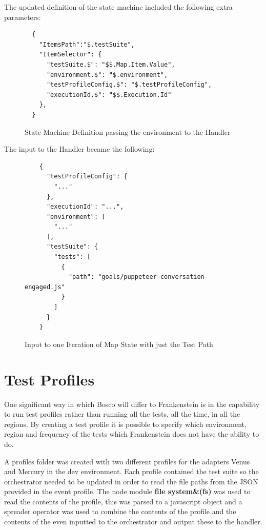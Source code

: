 \documentclass[12pt,a4paper,titlepage]{report}
\begin{document}
The updated definition of the state machine included the following extra parameters:

\begin{figure}[H]
 \begin{tcolorbox}
  \begin{verbatim}
  {
    "ItemsPath":"$.testSuite",
    "ItemSelector": {
      "testSuite.$": "$$.Map.Item.Value",
      "environment.$": "$.environment",
      "testProfileConfig.$": "$.testProfileConfig",
      "executionId.$": "$$.Execution.Id"
    },
  }
\end{verbatim}
 \end{tcolorbox}
 \caption{State Machine Definition passing the environment to the Handler}
\end{figure}

The input to the Handler became the following:

\begin{figure}[ht]
 \begin{tcolorbox}
  \begin{verbatim}
    {
      "testProfileConfig": {
        "..."
      },
      "executionId": "...",
      "environment": [
        "..."
      ],
      "testSuite": {
        "tests": [
          {
            "path": "goals/puppeteer-conversation-engaged.js"
          }
        ]
      }
    }
\end{verbatim}
 \end{tcolorbox}
 \caption{Input to one Iteration of Map State with just the Test Path}
\end{figure}


\section{Test Profiles}
One significant way in which Bosco will differ to Frankenstein is in the capability to run test profiles rather than 
running all the tests, all the time, in all the regions. By creating a test profile it is possible to specify which 
environment, region and frequency of the tests which Frankenstein does not have the ability to do. 

A profiles folder was created with two different profiles for the adapters Venus and Mercury in the dev environment. Each profile 
contained the test suite so the orchestrator needed to be updated in order to read the file paths from the JSON provided in the 
event profile. The node module \textbf{file system\&(fs)} was used to read the contents of the profile, this was parsed to 
a javascript object and a spreader operator was used to combine the contents of the profile and the contents of 
the even inputted to the orchestrator and output these to the handler.
\end{document}
